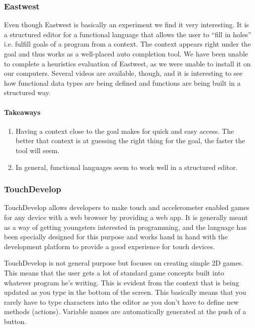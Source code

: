 \subsubsection{Eastwest}
Even though Eastwest is basically an experiment we find it very interesting. It is a structured editor for a functional language that allows the user to ``fill in holes'' i.e. fulfill goals of a program from a context. The context appears right under the goal and thus works as a well-placed auto completion tool. We have been unable to complete a heuristics evaluation of Eastwest, as we were unable to install it on our computers. Several videos are available, though, and it is interesting to see how functional data types are being defined and functions are being built in a structured way. 

\paragraph{Takeaways}
\begin{enumerate}
	\item Having a context close to the goal makes for quick and easy access. The better that context is at guessing the right thing for the goal, the faster the tool will seem.
	\item In general, functional languages seem to work well in a structured editor.
\end{enumerate}


\subsubsection{TouchDevelop}

TouchDevelop allows developers to make touch and accelerometer enabled games for any device with a web browser by providing a web app. It is generally meant as a way of getting youngsters interested in programming, and the language has been specially designed for this purpose and works hand in hand with the development platform to provide a good experience for touch devices.

TouchDevelop is not general purpose but focuses on creating simple 2D games. This means that the user gets a lot of standard game concepts built into whatever program he's writing. This is evident from the context that is being updated as you type in the bottom of the screen. This basically means that you rarely have to type characters into the editor as you don't have to define new methods (actions). Variable names are automatically generated at the push of a button.

